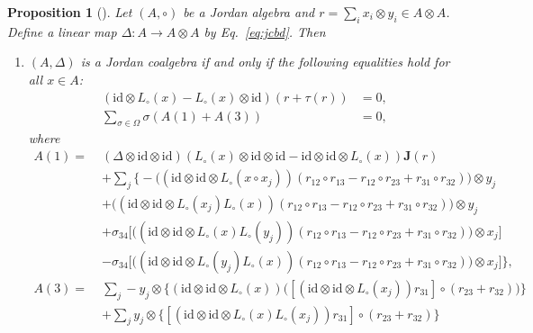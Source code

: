 \documentclass[12pt, reqno, a4paper]{amsart}
\newtheorem{proposition}[theorem]{Proposition}
\theoremstyle{definition}
\newcommand{\id}{\mathrm{id}}
\begin{document}
\begin{proposition}[\cite{hou2022new}]\label{prop:cobdppb}
	Let $(A, \circ)$ be a Jordan algebra and $r = \sum\nolimits_{i} x_i \otimes y_i \in A \otimes A$.
	Define a linear map $\Delta: A \to A \otimes A$ by Eq.~\eqref{eq:jcbd}.
	Then
	\begin{enumerate}[label=(\roman*)]
		\item\label{tdb:co1}
		      $(A,\Delta)$ is a Jordan coalgebra if and only if the following equalities hold for all $x \in A$:
		      \begin{align}
			      ( \id \otimes L_{\circ}(x)-L_{\circ}(x) \otimes \id )(r + \tau(r)) & = 0,  \label{CJBco:1} \\
			      \sum_{\sigma\in \Omega}\sigma(A(1) + A(3))                         & = 0, \label{CJBco:2}
		      \end{align}
		      where
		      \begin{align*}
			      A(1) =\; & (\Delta \otimes \id \otimes \id)(L_{\circ}(x) \otimes \id \otimes \id - \id \otimes \id \otimes L_{\circ}(x)) \mathbf{J}(r)                                                          \\
			               & + \sum_{j} \bigl\{ -\big((\id \otimes \id \otimes L_{\circ}(x \circ x_j)) (r_{12} \circ r_{13} - r_{12} \circ r_{23} + r_{31} \circ r_{32}) \big) \otimes y_j                        \\
			               & + \big( (\id \otimes \id \otimes L_{\circ}(x_j) L_{\circ}(x) ) (r_{12} \circ r_{13} - r_{12} \circ r_{23} + r_{31} \circ r_{32}) \big) \otimes y_j                                   \\
			               & + \sigma_{34} \bigl[ \big( (\id \otimes \id \otimes L_{\circ}(x) L_{\circ}(y_j)) (r_{12} \circ r_{13} - r_{12} \circ r_{23} + r_{31} \circ r_{32}) \big) \otimes x_j \bigr]          \\
			               & - \sigma_{34} \bigl[ \big( (\id \otimes \id \otimes L_{\circ}(y_j) L_{\circ}(x)) (r_{12} \circ r_{13} - r_{12} \circ r_{23} + r_{31} \circ r_{32}) \big) \otimes x_j \bigr] \bigr\}, \\
			      A(3) =\; & \sum_{j} - y_j \otimes \bigl\{ (\id \otimes \id \otimes L_{\circ}(x)) \big([(\id \otimes \id \otimes L_{\circ}(x_j))r_{31}] \circ (r_{23} + r_{32}) \big) \bigr\}                    \\
			               & + \sum_j y_j \otimes \bigl\{ [(\id \otimes \id \otimes L_{\circ}(x) L_{\circ}(x_j))r_{31}] \circ (r_{23} + r_{32}) \bigr\}                                                           \\

\end{align*}
\end{enumerate}
\end{proposition}
\end{document}

